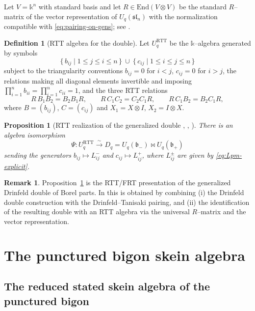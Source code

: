 \documentclass[11pt]{article}
\newcommand{\Bbbk}{\mathbb{k}}
\newcommand{\Uc}{U}
\newcommand{\sl}{\mathfrak{sl}}
\newcommand{\fb}{\mathfrak{b}}
\newcommand{\bipr}{\bowtie}
\theoremstyle{plain}
\newtheorem{proposition}[theorem]{Proposition}
\theoremstyle{definition}
\newtheorem{definition}[theorem]{Definition}
\newtheorem{remark}[theorem]{Remark}
\begin{document}
Let $V=\Bbbk^n$ with standard basis and let $R\in \mathrm{End}(V\otimes V)$ be the standard $R$--matrix of the vector representation of $\Uc_q(\sl_n)$ with the normalization compatible with \eqref{eq:pairing-on-gens}; see \cite[\S8.7]{KS}.

\begin{definition}[RTT algebra for the double]\label{def:RTT}
Let $\Uc_q^{\mathrm{RTT}}$ be the $\Bbbk$--algebra generated by symbols
\[
\{\,b_{ij}\mid 1\le j\le i\le n\,\}\ \cup\ \{\,c_{ij}\mid 1\le i\le j\le n\,\}
\]
subject to the triangularity conventions $b_{ij}=0$ for $i<j$, $c_{ij}=0$ for $i>j$,
the relations making all diagonal elements invertible and imposing $\prod_{i=1}^n b_{ii}=\prod_{i=1}^n c_{ii}=1$,
and the three RTT relations
\begin{equation}\label{eq:RTT-relations}
R\,B_1B_2=B_2B_1R,\qquad
R\,C_1C_2=C_2C_1R,\qquad
R\,C_1B_2=B_2C_1R,
\end{equation}
where $B=(b_{ij})$, $C=(c_{ij})$ and $X_1=X\otimes I$, $X_2=I\otimes X$.
\end{definition}

\begin{proposition}[RTT realization of the generalized double {\cite[\S9.3--\S9.5]{KS}, \cite{FRT}, \cite{Tanisaki}}]\label{prop:double=RTT}
There is an algebra isomorphism
\[
\Psi:\Uc_q^{\mathrm{RTT}}\xrightarrow{\ \sim\ } D_q=\Uc_q(\fb_-)\bipr \Uc_q(\fb_+)
\]
sending the generators $b_{ij}\mapsto L^-_{ij}$ and $c_{ij}\mapsto L^+_{ij}$, where $L^\pm_{ij}$ are given by \eqref{eq:Lpm-explicit}.
\end{proposition}

\begin{remark}
Proposition~\ref{prop:double=RTT} is the RTT/FRT presentation of the generalized Drinfeld double of Borel parts.
In \cite{KS} this is obtained by combining (i) the Drinfeld double construction with the Drinfeld--Tanisaki pairing, and (ii) the identification of the resulting double with an RTT algebra via the universal $R$--matrix and the vector representation.
\end{remark}

\section{The punctured bigon skein algebra}
\label{sec:skein}

\subsection{The reduced stated skein algebra of the punctured bigon}
\end{document}
